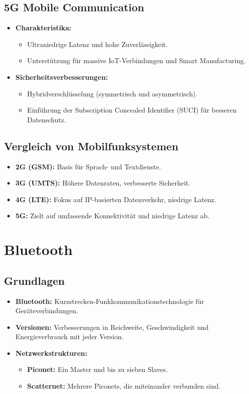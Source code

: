 \documentclass{article}
\begin{document}
\subsection{5G Mobile Communication}
\begin{itemize}
    \item \textbf{Charakteristika:}
    \begin{itemize}
        \item Ultraniedrige Latenz und hohe Zuverlässigkeit.
        \item Unterstützung für massive IoT-Verbindungen und Smart Manufacturing.
    \end{itemize}
    \item \textbf{Sicherheitsverbesserungen:}
    \begin{itemize}
        \item Hybridverschlüsselung (symmetrisch und asymmetrisch).
        \item Einführung der Subscription Concealed Identifier (SUCI) für besseren Datenschutz.
    \end{itemize}
\end{itemize}

\subsection{Vergleich von Mobilfunksystemen}
\begin{itemize}
    \item \textbf{2G (GSM):} Basis für Sprach- und Textdienste.
    \item \textbf{3G (UMTS):} Höhere Datenraten, verbesserte Sicherheit.
    \item \textbf{4G (LTE):} Fokus auf IP-basierten Datenverkehr, niedrige Latenz.
    \item \textbf{5G:} Zielt auf umfassende Konnektivität und niedrige Latenz ab.
\end{itemize}


\section{Bluetooth}

\subsection{Grundlagen}
\begin{itemize}
    \item \textbf{Bluetooth:} Kurzstrecken-Funkkommunikationstechnologie für Geräteverbindungen.
    \item \textbf{Versionen:} Verbesserungen in Reichweite, Geschwindigkeit und Energieverbrauch mit jeder Version.
    \item \textbf{Netzwerkstrukturen:}
    \begin{itemize}
        \item \textbf{Piconet:} Ein Master und bis zu sieben Slaves.
        \item \textbf{Scatternet:} Mehrere Piconets, die miteinander verbunden sind.
    \end{itemize}
\end{itemize}
\end{document}
